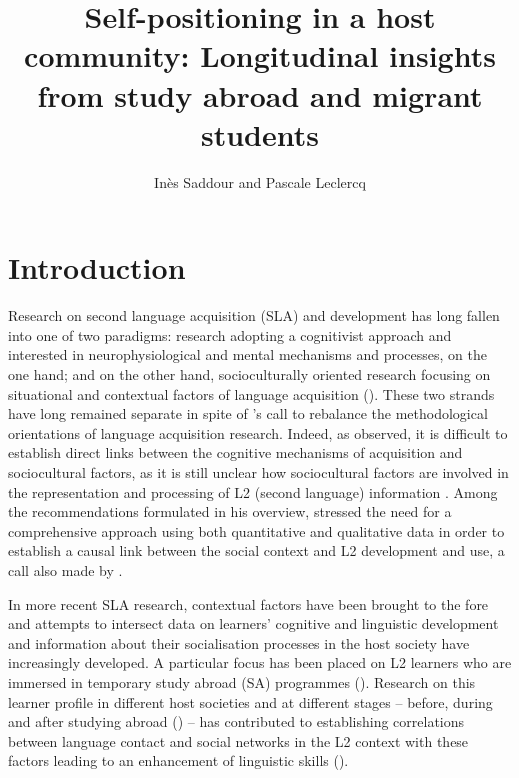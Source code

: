 \documentclass[output=paper]{langscibook}
\author{Inès Saddour\affiliation{University of Toulouse – Jean Jaurès} and Pascale Leclercq\affiliation{University of Paul Valéry Montpellier 3}}
\title[Self-positioning in a host community]{Self-positioning in a host community: Longitudinal insights from study abroad and migrant students}
\begin{document}
\maketitle


\section{Introduction}\label{sec:saddour:1}

Research on second language acquisition (SLA) and development has long fallen into one of two paradigms: research adopting a cognitivist approach and interested in neurophysiological and mental mechanisms and processes, on the one hand; and on the other hand, socioculturally oriented research focusing on situational and contextual factors of language acquisition (\citealt{MondadaDoehler2000, Dewaele2013, Véronique2013Socialization}). These two strands have long remained separate in spite of \citet{FirthWagner1997}’s call to rebalance the methodological orientations of language acquisition research. Indeed, as \citet{Véronique2013Socialization} observed, it is difficult to establish direct links between the cognitive mechanisms of acquisition and sociocultural factors, as it is still unclear how sociocultural factors are involved in the representation and processing of L2 (second language) information \citep{Hulstijn2007}. Among the recommendations formulated in his overview, \citet[270]{Véronique2013Socialization} stressed the need for a comprehensive approach using both quantitative and qualitative data in order to establish a causal link between the social context and L2 development and use, a call also made by \citet{Coleman2013}.

In more recent SLA research, contextual factors have been brought to the fore and attempts to intersect data on learners’ cognitive and linguistic development and information about their socialisation processes in the host society have increasingly developed. A particular focus has been placed on L2 learners who are immersed in temporary study abroad (SA) programmes (\citealt{SchartnerWright2013, Tracy-Ventura2017, HuenschEtAl2019, McManus2019}). Research on this learner profile in different host societies and at different stages – before, during and after studying abroad (\citealt{Mitchell2015, MitchellHuensch2020}) – has contributed to establishing correlations between language contact and social networks in the L2 context with these factors leading to an enhancement of linguistic skills (\citealt{DewaeleDewaele2021}).
\end{document}
